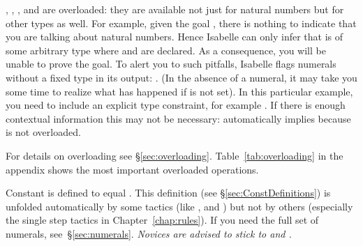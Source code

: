 \begin{isabellebody}
\begin{isamarkuptext}
\begin{warn}
  , ,
  ,  and
   are overloaded: they are available
  not just for natural numbers but for other types as well.
  For example, given the goal , there is nothing to indicate
  that you are talking about natural numbers. Hence Isabelle can only infer
  that  is of some arbitrary type where  and \isa{{\isacharplus}} are
  declared. As a consequence, you will be unable to prove the
  goal. To alert you to such pitfalls, Isabelle flags numerals without a
  fixed type in its output: . (In the absence of a numeral,
  it may take you some time to realize what has happened if  is not set).  In this particular example, you need to include
  an explicit type constraint, for example . If there
  is enough contextual information this may not be necessary:  automatically implies  because  is not
  overloaded.

  For details on overloading see \S\ref{sec:overloading}.
  Table~\ref{tab:overloading} in the appendix shows the most important
  overloaded operations.
\end{warn}
\begin{warn}
  Constant  is defined to equal . This definition
  (see \S\ref{sec:ConstDefinitions}) is unfolded automatically by some
  tactics (like ,  and ) but not by
  others (especially the single step tactics in Chapter~\ref{chap:rules}).
  If you need the full set of numerals, see~\S\ref{sec:numerals}.
  \emph{Novices are advised to stick to  and .}
\end{warn}


\end{isamarkuptext}
\end{isabellebody}
